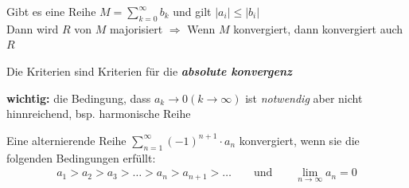 \documentclass[a4paper]{article}
\begin{document}
	\begin{fsatz}[Majorantenkriterium]
			Gibt es eine Reihe $M = \sum \limits_{k=0}^{\infty}b_k$ und gilt \hspace{3mm} $|a_i| \le |b_i|$\\[3mm]
			Dann wird $R$ von $M$ majorisiert \hspace{3mm}$\Rightarrow$\hspace{3mm} Wenn $M$ konvergiert, dann konvergiert auch $R$
	\end{fsatz}
	Die Kriterien sind Kriterien für die \textbf{\textit{absolute
	konvergenz}}
	
	\textbf{wichtig:} die Bedingung, dass $a_k \rightarrow 0 (k
	\rightarrow \infty)$ ist \textit{notwendig} aber nicht hinnreichend,
	bsp. harmonische Reihe
	\begin{fsatz}
		Eine alternierende Reihe $\sum_{n=1}^\infty (-1)^{n+1} \cdot a_n$ konvergiert, wenn sie die folgenden Bedingungen erfüllt:
		\begin{align*}
			a_1 > a_2 > a_3 > \ldots > a_n > a_{n+1} > \ldots \qquad \text{und} \qquad \lim_{n \rightarrow \infty} a_n = 0
		\end{align*}

	\end{fsatz}
	
\end{document}
